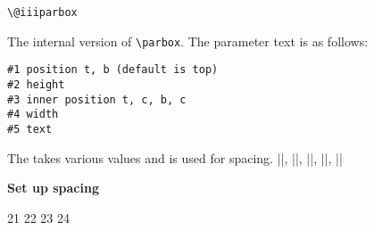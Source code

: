 \begin{teX}
\def\@iparbox[#1]{%
   \@ifnextchar[%
   {\@iiparbox{#1}}%
   {\@iiiparbox{#1}\relax[s]}}
\end{teX}


  

\begin{teX}
\def\@iiparbox#1[#2]{%
   \@ifnextchar[%
   {\@iiiparbox{#1}{#2}}%
   {\@iiiparbox{#1}{#2}[#1]}}

\end{teX}

\begin{teX}
   \let\@parboxto\@empty
\end{teX}

\hspace{-1cm}\texttt{\textbackslash @iiiparbox}

The internal version of \texttt{\textbackslash parbox}. The parameter text is as follows:

\begin{verbatim}
#1 position t, b (default is top)
#2 height
#3 inner position t, c, b, c
#4 width
#5 text
\end{verbatim}

\begin{teX}
  \long{}
\end{teX}

\noindent The  takes various values and is used for spacing. 
|\bm@l|, |\bm@r|, |\bm@s|, |\bm@t|, |\bm@b|


\textbf{Set up spacing}

\begin{teXX}
21 \def\bm@c{\hss\unhbox\@tempboxa\hss}
22 \def\bm@l{\unhbox\@tempboxa\hss}\let\bm@t\bm@l
23 \def\bm@r{\hss\unhbox\@tempboxa}\let\bm@b\bm@r
24 \def\bm@s{\unhbox\@tempboxa}
\end{teXX}


